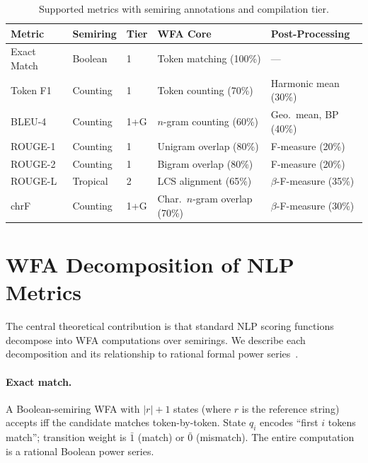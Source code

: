 \documentclass[11pt]{article}
\begin{document}
\begin{table}[t]
\centering
\caption{Supported metrics with semiring annotations and compilation tier.}
\label{tab:metrics}
\smallskip
\begin{tabular}{@{}lllll@{}}
\toprule
\textbf{Metric} & \textbf{Semiring} & \textbf{Tier} &
  \textbf{WFA Core} & \textbf{Post-Processing} \\
\midrule
Exact Match  & Boolean   & 1     & Token matching (100\%) & --- \\
Token F1     & Counting  & 1     & Token counting (70\%) & Harmonic mean (30\%) \\
BLEU-4       & Counting  & 1+G   & $n$-gram counting (60\%) & Geo.\ mean, BP (40\%) \\
ROUGE-1      & Counting  & 1     & Unigram overlap (80\%) & F-measure (20\%) \\
ROUGE-2      & Counting  & 1     & Bigram overlap (80\%) & F-measure (20\%) \\
ROUGE-L      & Tropical  & 2     & LCS alignment (65\%) & $\beta$-F-measure (35\%) \\
chrF         & Counting  & 1+G   & Char.\ $n$-gram overlap (70\%) & $\beta$-F-measure (30\%) \\
\bottomrule
\end{tabular}
\end{table}


\section{WFA Decomposition of NLP Metrics}\label{sec:wfa}

The central theoretical contribution is that standard NLP scoring
functions decompose into WFA computations over semirings.  We describe
each decomposition and its relationship to rational formal power
series~\cite{schutzenberger1961}.

\paragraph{Exact match.}
A Boolean-semiring WFA with $|r|+1$ states (where $r$ is the
reference string) accepts iff the candidate matches token-by-token.
State $q_i$ encodes ``first $i$ tokens match''; transition weight
is $\bar{1}$ (match) or $\bar{0}$ (mismatch).  The entire computation
is a rational Boolean power series.
\end{document}
